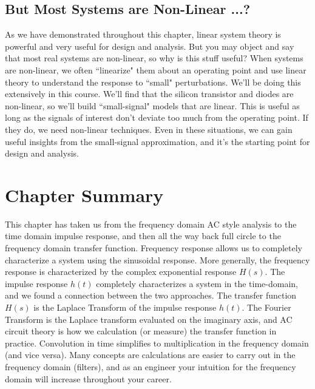 \subsection{But Most Systems are Non-Linear ...?}
As we have demonstrated throughout this chapter, linear system theory is powerful and very useful for design and analysis.  But you may object and say that most real systems are non-linear, so why is this stuff useful?
When systems are non-linear, we often ``linearize" them about an operating point and use linear theory to understand the response to ``small" perturbations.  We'll be doing this extensively in this course. We'll find that the silicon transistor and diodes are non-linear, so we'll build ``small-signal" models that are linear.  This is useful as long as the signals of interest don't deviate too much from the operating point.  If they do, we need non-linear techniques.  Even in these situations,  we can gain useful insights from the small-signal approximation, and it's the starting point for design and analysis.
\section{Chapter Summary}
This chapter has taken us from the frequency domain AC style analysis to the time domain impulse response, and then all the way back full circle to the frequency domain transfer function.
Frequency response allows us to completely characterize a system using the sinusoidal response.
More generally, the frequency response is characterized by the complex exponential response $H(s)$.   The impulse response $h(t)$ completely characterizes a system in the time-domain, and we found a connection between the two approaches.   The transfer function $H(s)$ is the Laplace Transform of the impulse response $h(t)$.  The Fourier Transform is the Laplace transform evaluated on the imaginary axis, and AC circuit theory is how we calculation (or measure) the transfer function in practice.   Convolution in time simplifies to multiplication in the frequency domain (and vice versa).
Many concepts are calculations are easier to carry out in the frequency domain (filters), and as an engineer your intuition for the frequency domain will increase throughout your career.
 
